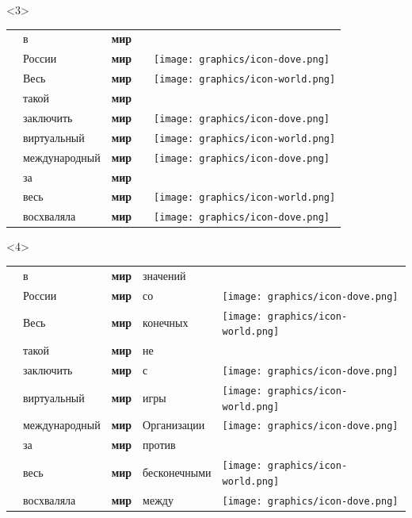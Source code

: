 \documentclass[10pt, compress]{beamer}
\begin{document}
\begin{frame}
\begin{center}
\begin{onlyenv}
\end{onlyenv}
\begin{onlyenv}<3>
\begin{tabular}{p{2.5cm}p{2.5cm}p{1.0cm}p{2.5cm}p{1.0cm}}
      & в    &  \textbf{мир}  &      &      \\
      & России    &  \textbf{мир}  &      & \texttt{[image: graphics/icon-dove.png]} \\
      & Весь    &  \textbf{мир}  &      &  \texttt{[image: graphics/icon-world.png]}    \\
      & такой    &  \textbf{мир}  &      &     \\
      & заключить    &  \textbf{мир}  &      &   \texttt{[image: graphics/icon-dove.png]}   \\
      & виртуальный    &  \textbf{мир}  &      &  \texttt{[image: graphics/icon-world.png]}    \\
      & международный    &  \textbf{мир}  &      & \texttt{[image: graphics/icon-dove.png]}     \\
      & за    &  \textbf{мир}  &      &      \\
      & весь    &  \textbf{мир}  &      &  \texttt{[image: graphics/icon-world.png]}    \\
      & восхваляла    &  \textbf{мир}  &      &  \texttt{[image: graphics/icon-dove.png]}    \\
\end{tabular}

\end{onlyenv}

\begin{onlyenv}<4>
\begin{tabular}{p{2.5cm}p{2.5cm}p{1.0cm}p{2.5cm}p{1.0cm}}
      & в    &  \textbf{мир}  & значений     &      \\
      & России    &  \textbf{мир}  & со     &  \texttt{[image: graphics/icon-dove.png]}    \\
      & Весь    &  \textbf{мир}  &  конечных    &  \texttt{[image: graphics/icon-world.png]}    \\
      & такой    &  \textbf{мир}  &  не    &      \\
      & заключить    &  \textbf{мир}  & с     & \texttt{[image: graphics/icon-dove.png]}     \\
      & виртуальный    &  \textbf{мир}  & игры     &  \texttt{[image: graphics/icon-world.png]}    \\
      & международный    &  \textbf{мир}  & Организации     &  \texttt{[image: graphics/icon-dove.png]}    \\
      & за    &  \textbf{мир}  & против     &      \\
      & весь    &  \textbf{мир}  &  бесконечными    &  \texttt{[image: graphics/icon-world.png]}    \\
      & восхваляла    &  \textbf{мир}  & между     & \texttt{[image: graphics/icon-dove.png]}     \\
\end{tabular}


\end{onlyenv}
\end{center}
\end{frame}
\end{document}
